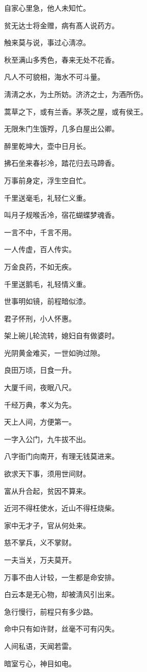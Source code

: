 \documentclass[12pt,oneside]{book}
\begin{document}
自家心里急，他人未知忙。

贫无达士将金赠，病有髙人说药方。

触来莫与说，事过心淸凉。

秋至满山多秀色，春来无处不花香。

凡人不可貌相，海水不可斗量。

淸淸之水，为土所妨。济济之士，为酒所伤。

蒿草之下，或有兰香。茅茨之屋，或有侯王。

无限朱门生饿殍，几多白屋出公卿。

醉里乾坤大，壶中日月长。

拂石坐来春衫冷，踏花归去马蹄香。

万事前身定，浮生空自忙。

千里送毫毛，礼轻仁义重。

叫月子规喉舌冷，宿花蝴蝶梦魂香。

一言不中，千言不用。

一人传虚，百人传实。

万金良药，不如无疾。

千里送鹅毛，礼轻情义重。

世事明如镜，前程暗似漆。

君子怀刑，小人怀惠。

架上碗儿轮流转，媳妇自有做婆时。

光阴黄金难买，一世如驹过隙。

良田万顷，日食一升。

大厦千间，夜眠八尺。

千经万典，孝义为先。

天上人间，方便第一。

一字入公门，九牛拔不出。

八字衙门向南开，有理无钱莫进来。

欲求天下事，须用世间财。

富从升合起，贫因不算来。

近河不得枉使水，近山不得枉烧柴。

家中无才子，官从何处来。

慈不掌兵，义不掌财。

一夫当关，万夫莫开。

万事不由人计较，一生都是命安排。

白云本是无心物，却被淸风引出来。

急行慢行，前程只有多少路。

命中只有如许财，丝毫不可有闪失。

人间私语，天闻若雷。

暗室亏心，神目如电。
\end{document}
